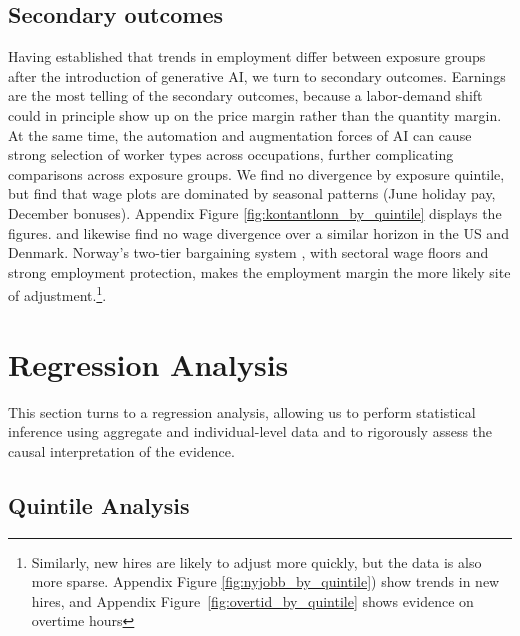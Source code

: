 \documentclass[12pt]{article}
\begin{document}
\subsection{Secondary outcomes}\label{sec:results:extensions}

Having established that trends in employment differ between exposure groups after the introduction of generative AI, we turn to secondary outcomes. Earnings are the most telling of the secondary outcomes, because a labor-demand shift could in principle show up on the price margin rather than the quantity margin. At the same time, the automation and augmentation forces of AI can cause strong selection of worker types across occupations, further complicating comparisons across exposure groups. We find no divergence by exposure quintile, but find that wage plots are dominated by seasonal patterns (June holiday pay, December bonuses). Appendix Figure \ref{fig:kontantlonn_by_quintile} displays the figures. \citet{brynjolfsson2025} and \citet{humlum2026} likewise find no wage divergence over a similar horizon in the US and Denmark. Norway's two-tier bargaining system \citep{bhuller2022}, with sectoral wage floors and strong employment protection, makes the employment margin the more likely site of adjustment.\footnote{Similarly, new hires are likely to adjust more quickly, but the data is also more sparse. Appendix Figure \ref{fig:nyjobb_by_quintile}) show trends in new hires, and Appendix Figure~\ref{fig:overtid_by_quintile} shows evidence on overtime hours}. 


\section{Regression Analysis}\label{sec:regression}
This section turns to a regression analysis, allowing us to perform statistical inference using aggregate and individual-level data and to rigorously assess the causal interpretation of the evidence.

\subsection{Quintile Analysis}\label{sec:regression:quintile}
\end{document}
